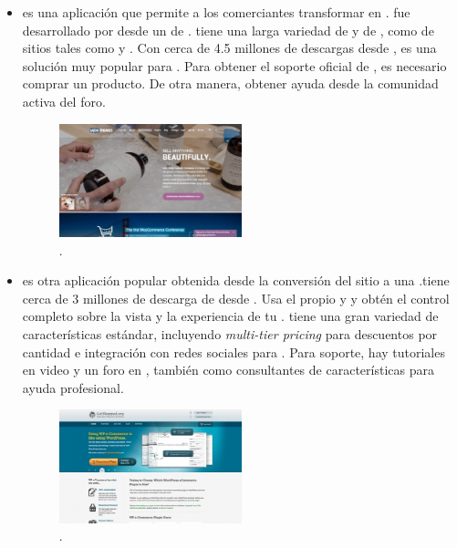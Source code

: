 \begin{itemize}
	\item \textbf{\nameWooCommerce} es una aplicación \ecommerce \free \opensource que permite a los comerciantes transformar \wordPress \sites en \stores. \nameWooCommerce fue desarrollado por \wooThemes desde un \fork de \nameJigoshop. \nameWooCommerce tiene una larga variedad de  \plugins y  \themes de \wooThemes, como de sitios \thirdParty tales como \themeForest \cite{online_ThemeForest} y \codeCanyon \cite{online_CodeCanyon}. Con cerca de 4.5 millones de descargas desde \wordPressOrg\cite{online_WordPress}, \nameWooCommerce es una solución \ecommerce muy popular para \wordPress. Para obtener el soporte oficial de \wooThemes, es necesario comprar un producto. De otra manera, obtener ayuda desde la comunidad activa del foro.

	\begin{figure}[h!]
		\centering
		\includegraphics[width=0.5\textwidth]{figuras/cap1/WooCommerceWebsite.jpg}
		\caption{\nameWooCommerce \website\cite{online_WooCommerce}.}
	\end{figure}

	\item \textbf{\nameWPECommerce} es otra aplicación popular obtenida desde la conversión del  sitio \wordPress a una \ecommerce \store.\nameWPECommerce tiene cerca de 3 millones de descarga de \plugin desde \wordPressOrg\cite{online_WordPress}. Usa el propio \html y \css y obtén el control completo sobre la vista y la experiencia de tu \online \store. \nameWPECommerce tiene una gran variedad de características estándar, incluyendo \textit{ multi-tier pricing} para descuentos por cantidad e integración con redes sociales para \marketing. Para soporte, hay tutoriales en video y un foro en \wordPressOrg, también como consultantes de características para ayuda profesional.

	\begin{figure}[h!]
		\centering
		\includegraphics[width=0.5\textwidth]{figuras/cap1/WPECommerceWebsite.jpg}
		\caption{\nameWPECommerce \website\cite{online_WPECommerce}.}
	\end{figure}


\end{itemize}
